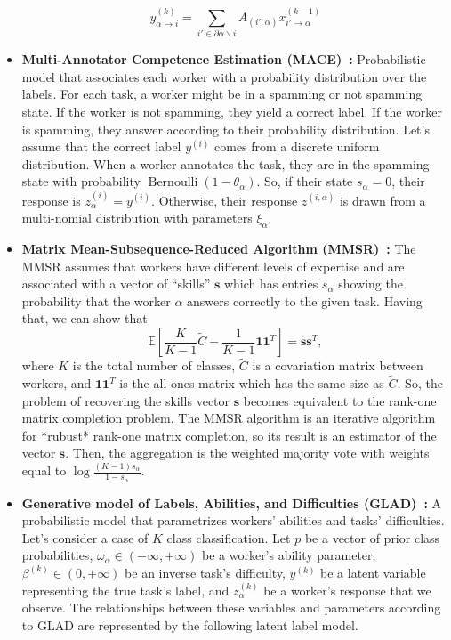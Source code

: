 \documentclass[default]{bst/sn-jnl_mine}%
\begin{document}
\begin{itemize}
\begin{equation}
        y_{\alpha \rightarrow i}^{(k)} = \sum_{i' \in \partial \alpha \backslash i} A_{(i',\alpha)} x_{i' \rightarrow \alpha}^{(k-1)}
    \end{equation}
    \item \textbf{Multi-Annotator Competence Estimation (MACE)~\cite{hovy_MACE_2013,crowdkit_webpage_documentation}:}
    Probabilistic model that associates each worker with a probability distribution over the labels. For each task, a worker might be in a spamming or not spamming state. If the worker is not spamming, they yield a correct label. If the worker is spamming, they answer according to their probability distribution. Let's assume that the correct label $y^{(i)}$ comes from a discrete uniform distribution. When a worker annotates the task, they are in the spamming state with probability $\operatorname{Bernoulli}(1 - \theta_{\alpha})$. So, if their state $s_{\alpha} = 0$, their response is $z^{(i)}_{\alpha} = y^{(i)}$. Otherwise, their response $z^{(i,\alpha)}$ is drawn from a multi-nomial distribution with parameters $\xi_{\alpha}$.
    \item \textbf{Matrix Mean-Subsequence-Reduced Algorithm (MMSR)~\cite{ma_Adversarial_2020,crowdkit_webpage_documentation}:} The MMSR assumes that workers have different levels of expertise and are associated with a vector of ``skills'' $\boldsymbol{s}$ which has entries $s_{\alpha}$ showing the probability that the worker $\alpha$ answers correctly to the given task. Having that, we can show that%
    \begin{equation}
        \mathbb{E}\left[\frac{K}{K-1}\widetilde{C}-\frac{1}{K-1}\boldsymbol{1}\boldsymbol{1}^T\right]
        = \boldsymbol{s}\boldsymbol{s}^T,
    \end{equation}
    where $K$ is the total number of classes, $\widetilde{C}$ is a covariation matrix between workers, and $\boldsymbol{1}\boldsymbol{1}^T$ is the all-ones matrix which has the same size as $\widetilde{C}$.
    So, the problem of recovering the skills vector $\boldsymbol{s}$ becomes equivalent to the rank-one matrix completion problem. The MMSR algorithm is an iterative algorithm for *rubust* rank-one matrix completion, so its result is an estimator of the vector $\boldsymbol{s}$. Then, the aggregation is the weighted majority vote with weights equal to $\log \frac{(K-1)s_{\alpha}}{1-s_{\alpha}}$.
    \item \textbf{Generative model of Labels, Abilities, and Difficulties (GLAD)~\cite{whitehill_Whose_2009,crowdkit_webpage_documentation}:} A probabilistic model that parametrizes workers' abilities and tasks' difficulties. Let's consider a case of $K$ class classification. Let $p$ be a vector of prior class probabilities, $\omega_{\alpha} \in (-\infty, +\infty)$ be a worker's ability parameter, $\beta^{(k)} \in (0, +\infty)$ be an inverse task's difficulty, $y^{(k)}$ be a latent variable representing the true task's label, and $z_{\alpha}^{(k)}$ be a worker's response that we observe. The relationships between these variables and parameters according to GLAD are represented by the following latent label model.

\end{itemize}
\end{document}
